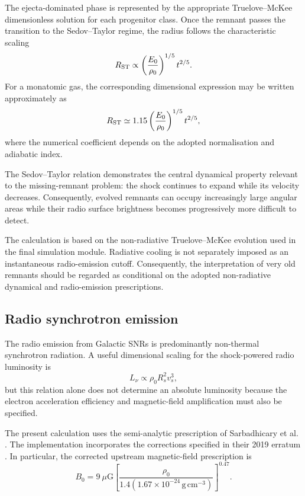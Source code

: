 \documentclass[
aps,
prd,
reprint,
superscriptaddress,
nofootinbib
]{revtex4-2}
\begin{document}
	The ejecta-dominated phase is represented by the appropriate
	Truelove--McKee dimensionless solution for each progenitor class.  Once the
	remnant passes the transition to the Sedov--Taylor regime, the radius follows
	the characteristic scaling
	\begin{equation}
		R_{\rm ST}
		\propto
		\left(
		\frac{E_0}{\rho_0}
		\right)^{1/5}
		t^{2/5}.
		\label{eq:sedov}
	\end{equation}
	For a monatomic gas, the corresponding dimensional expression may be written
	approximately as
	\begin{equation}
		R_{\rm ST}
		\simeq
		1.15
		\left(
		\frac{E_0}{\rho_0}
		\right)^{1/5}
		t^{2/5},
		\label{eq:sedovfull}
	\end{equation}
	where the numerical coefficient depends on the adopted normalisation and
	adiabatic index.
	
	The Sedov--Taylor relation demonstrates the central dynamical property relevant
	to the missing-remnant problem: the shock continues to expand while its
	velocity decreases.  Consequently, evolved remnants can occupy increasingly
	large angular areas while their radio surface brightness becomes progressively
	more difficult to detect.
	
	The calculation is based on the non-radiative Truelove--McKee evolution used
	in the final simulation module.  Radiative cooling is not separately imposed
	as an instantaneous radio-emission cutoff.  Consequently, the interpretation
	of very old remnants should be regarded as conditional on the adopted
	non-radiative dynamical and radio-emission prescriptions.
	
	\subsection{Radio synchrotron emission}
	\label{sec:radio}
	
	The radio emission from Galactic SNRs is predominantly non-thermal
	synchrotron radiation.  A useful dimensional scaling for the shock-powered
	radio luminosity is
	\begin{equation}
		L_\nu\propto
		\rho_0R_s^2v_s^3,
	\end{equation}
	but this relation alone does not determine an absolute luminosity because the
	electron acceleration efficiency and magnetic-field amplification must also
	be specified.
	
	The present calculation uses the semi-analytic prescription of Sarbadhicary
	et al. \cite{Sarbadhicary2017}.  The implementation incorporates the corrections
	specified in their 2019 erratum \cite{Sarbadhicary2019}.  In particular, the
	corrected upstream magnetic-field prescription is
	\begin{equation}
		B_0=
		9~\mu\mathrm{G}
		\left[
		\frac{\rho_0}
		{1.4(1.67\times10^{-24}\,\mathrm{g\,cm^{-3}})}
		\right]^{0.47}.
		\label{eq:B0}
	\end{equation}
	
\end{document}
